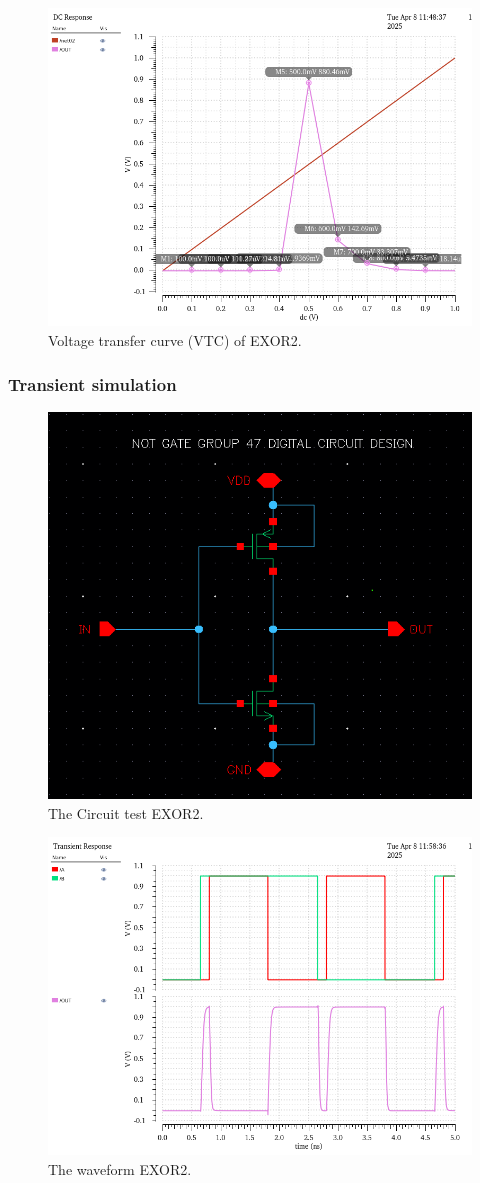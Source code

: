 \begin{figure}[H]
	\centering
	\includegraphics[width=.6\linewidth]{section/EX1/EXOR/EX1_EXOR2_DCanalysis_vtc.png}
	\caption{Voltage transfer curve (VTC) of EXOR2.}
	\label{f_EX1_EXOR2_DCanalysis_vtc}
\end{figure}

\subsubsection{Transient simulation}

\begin{figure}[H]
	\centering
	\includegraphics[width=.6\linewidth]{section/EX1/EXOR/EX1_EXOR2_Trans_schematic.png}
	\caption{The Circuit test EXOR2.}
\end{figure}

\begin{figure}[H]
	\centering
	\includegraphics[width=.6\linewidth]{section/EX1/EXOR/EX1_EXOR2_waveform.png}
	\caption{The waveform EXOR2.}
	\label{f_EX1_EXOR2_waveform}
\end{figure}

